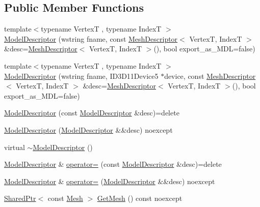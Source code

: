 \subsection*{Public Member Functions}
\begin{DoxyCompactItemize}
\item 
{\footnotesize template$<$typename VertexT , typename IndexT $>$ }\\\hyperlink{classmage_1_1_model_descriptor_aaf8468659b744b029505ff3024fc633d}{Model\+Descriptor} (wstring fname, const \hyperlink{structmage_1_1_mesh_descriptor}{Mesh\+Descriptor}$<$ VertexT, IndexT $>$ \&desc=\hyperlink{structmage_1_1_mesh_descriptor}{Mesh\+Descriptor}$<$ VertexT, IndexT $>$(), bool export\+\_\+as\+\_\+\+M\+DL=false)
\item 
{\footnotesize template$<$typename VertexT , typename IndexT $>$ }\\\hyperlink{classmage_1_1_model_descriptor_ad4c12dadb852eb4f9541b1b4addad5e9}{Model\+Descriptor} (wstring fname, I\+D3\+D11\+Device5 $\ast$device, const \hyperlink{structmage_1_1_mesh_descriptor}{Mesh\+Descriptor}$<$ VertexT, IndexT $>$ \&desc=\hyperlink{structmage_1_1_mesh_descriptor}{Mesh\+Descriptor}$<$ VertexT, IndexT $>$(), bool export\+\_\+as\+\_\+\+M\+DL=false)
\item 
\hyperlink{classmage_1_1_model_descriptor_af44185efc20e10ede762d29bc454c5f3}{Model\+Descriptor} (const \hyperlink{classmage_1_1_model_descriptor}{Model\+Descriptor} \&desc)=delete
\item 
\hyperlink{classmage_1_1_model_descriptor_a4d6da1dcbceea8ec6c7dcde94bb83434}{Model\+Descriptor} (\hyperlink{classmage_1_1_model_descriptor}{Model\+Descriptor} \&\&desc) noexcept
\item 
virtual \hyperlink{classmage_1_1_model_descriptor_aae13cf050ee7f9283d91282c04f62df1}{$\sim$\+Model\+Descriptor} ()
\item 
\hyperlink{classmage_1_1_model_descriptor}{Model\+Descriptor} \& \hyperlink{classmage_1_1_model_descriptor_a734b17224719896921e9f6252ee88483}{operator=} (const \hyperlink{classmage_1_1_model_descriptor}{Model\+Descriptor} \&desc)=delete
\item 
\hyperlink{classmage_1_1_model_descriptor}{Model\+Descriptor} \& \hyperlink{classmage_1_1_model_descriptor_aea3caadade51ff234b9a6e2e89f47321}{operator=} (\hyperlink{classmage_1_1_model_descriptor}{Model\+Descriptor} \&\&desc) noexcept
\item 
\hyperlink{namespacemage_a1e01ae66713838a7a67d30e44c67703e}{Shared\+Ptr}$<$ const \hyperlink{classmage_1_1_mesh}{Mesh} $>$ \hyperlink{classmage_1_1_model_descriptor_a730dedd388929c74ed504395ad2601fc}{Get\+Mesh} () const noexcept

\end{DoxyCompactItemize}
